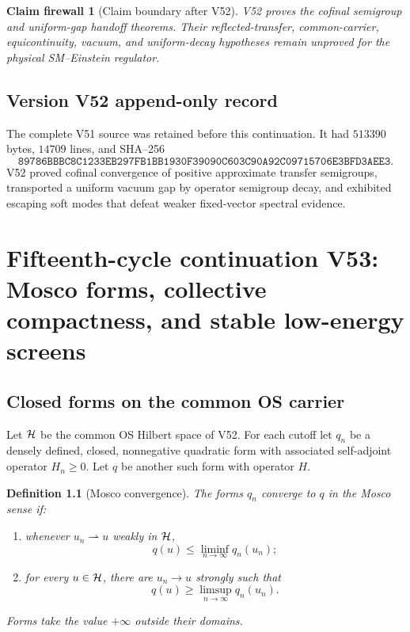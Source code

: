 \documentclass[11pt]{article}
\newtheorem{definition}[theorem]{Definition}
\newtheorem{firewall}[theorem]{Claim firewall}
\theoremstyle{remark}
\begin{document}
\begin{firewall}[Claim boundary after V52]
\label{fire:v15v52}
V52 proves the cofinal semigroup and uniform-gap handoff theorems.
Their reflected-transfer, common-carrier, equicontinuity, vacuum,
and uniform-decay hypotheses remain unproved for the physical
SM--Einstein regulator.
\end{firewall}

\section*{Version V52 append-only record}
The complete V51 source was retained before this continuation.  It
had \(513390\) bytes, \(14709\) lines, and SHA--256
\[
 \texttt{89786BBBC8C1233EB297FB1BB1930F39090C603C90A92C09715706E3BFD3AEE3}.
\]
V52 proved cofinal convergence of positive approximate transfer
semigroups, transported a uniform vacuum gap by operator semigroup
decay, and exhibited escaping soft modes that defeat weaker
fixed-vector spectral evidence.

\chapter{Fifteenth-cycle continuation V53: Mosco forms, collective compactness, and stable low-energy screens}
\label{sec:v15v53}

\section{Closed forms on the common OS carrier}

Let \({\cal H}\) be the common OS Hilbert space of V52.  For each
cutoff let \(q_n\) be a densely defined, closed, nonnegative
quadratic form with associated self-adjoint operator \(H_n\geq0\).
Let \(q\) be another such form with operator \(H\).

\begin{definition}[Mosco convergence]
\label{def:v15v53-mosco}
The forms \(q_n\) converge to \(q\) in the Mosco sense if:
\begin{enumerate}
\item whenever \(u_n\rightharpoonup u\) weakly in \({\cal H}\),
      \[
       q(u)\leq\liminf_{n\to\infty}q_n(u_n);             \tag{53.1}
      \]
\item for every \(u\in{\cal H}\), there are \(u_n\to u\) strongly
      such that
      \[
       q(u)\geq\limsup_{n\to\infty}q_n(u_n).             \tag{53.2}
      \]
\end{enumerate}
Forms take the value \(+\infty\) outside their domains.
\end{definition}
\end{document}
